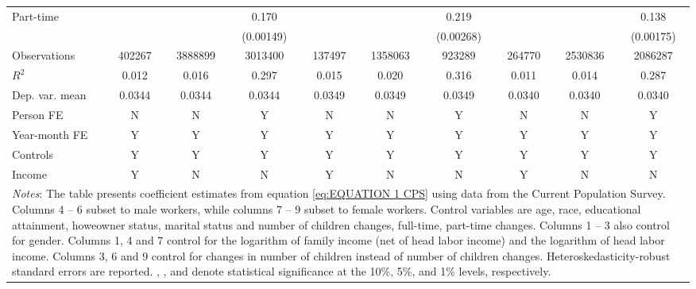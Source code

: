 {\begin{tabular}{l*{9}{c}}
\addlinespace
Part-time           &                     &                     &       0.170\sym{***}&                     &                     &       0.219\sym{***}&                     &                     &       0.138\sym{***}\\
                    &                     &                     &   (0.00149)         &                     &                     &   (0.00268)         &                     &                     &   (0.00175)         \\
\midrule
Observations        &      402267         &     3888899         &     3013400         &      137497         &     1358063         &      923289         &      264770         &     2530836         &     2086287         \\
\(R^{2}\)           &       0.012         &       0.016         &       0.297         &       0.015         &       0.020         &       0.316         &       0.011         &       0.014         &       0.287         \\
Dep. var. mean      &      0.0344         &      0.0344         &      0.0344         &      0.0349         &      0.0349         &      0.0349         &      0.0340         &      0.0340         &      0.0340         \\
Person FE           &           N         &           N         &           Y         &           N         &           N         &           Y         &           N         &           N         &           Y         \\
Year-month FE       &           Y         &           Y         &           Y         &           Y         &           Y         &           Y         &           Y         &           Y         &           Y         \\
Controls            &           Y         &           Y         &           Y         &           Y         &           Y         &           Y         &           Y         &           Y         &           Y         \\
Income              &           Y         &           N         &           N         &           Y         &           N         &           N         &           Y         &           N         &           N         \\
\bottomrule
\multicolumn{10}{p{17cm}}{\footnotesize \textit{Notes}: The table presents coefficient estimates from equation \ref{eq:EQUATION 1 CPS} using data from the Current Population Survey. Columns 4 -- 6 subset to male workers, while columns 7 -- 9 subset to female workers. Control variables are age, race, educational attainment, howeowner status, marital status and number of children changes, full-time, part-time changes. Columns 1 -- 3 also control for gender. Columns 1, 4 and 7 control for the logarithm of family income (net of head labor income) and the logarithm of head labor income. Columns 3, 6 and 9 control for changes in number of children instead of number of children changes. Heteroskedasticity-robust standard errors are reported. \sym{*}, \sym{**}, and \sym{***} denote statistical significance at the 10\%, 5\%, and 1\% levels, respectively.}\\
\end{tabular}
}
